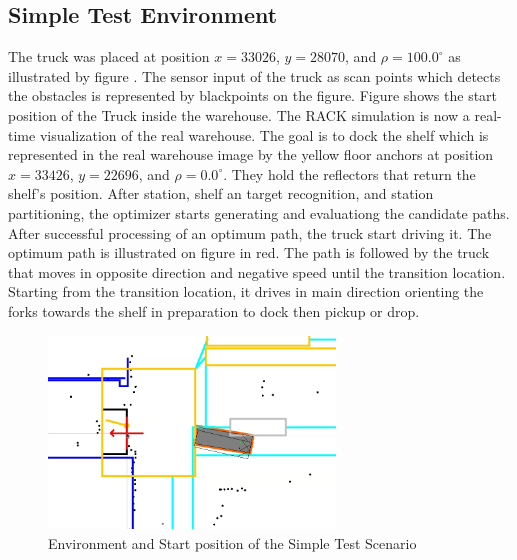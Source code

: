 \subsection{Simple Test Environment}
The truck was placed at position \(x = 33026\), \(y = 28070\), and \(\rho = 100.0^\circ\) 
as illustrated by 
figure .
The sensor input of the truck as scan points which detects the obstacles is represented by blackpoints
on the figure. Figure  shows the start position of the Truck inside the warehouse.
The RACK simulation is now a real-time visualization of the real warehouse.
The goal is to dock the shelf which is represented in the real warehouse image 
by the yellow floor anchors at position \(x = 33426\), \(y = 22696\), and \(\rho = 0.0^\circ\). 
They hold the reflectors that return the shelf's position.
After station, shelf an target recognition, and station partitioning,
the optimizer starts generating and evaluationg the candidate paths.
After successful processing of an optimum path, the truck start driving it.
The optimum path is illustrated on figure  in red. The path is followed by the truck 
that moves in opposite direction and negative speed until the transition location.
Starting from the transition location, it drives in main direction orienting the forks 
towards the shelf in preparation to dock then pickup or drop. 


\begin{figure}[H]
    \begin{center}
        \includegraphics[width=3in]{images/Chap3/StartSimpleEnv.png} %
        \caption{Environment and Start position of the Simple Test Scenario}
        \label{OptResult10}
        \end{center}    
\end{figure}



